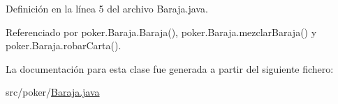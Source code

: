 Definición en la línea 5 del archivo Baraja.\+java.



Referenciado por poker.\+Baraja.\+Baraja(), poker.\+Baraja.\+mezclar\+Baraja() y poker.\+Baraja.\+robar\+Carta().



La documentación para esta clase fue generada a partir del siguiente fichero\+:\begin{DoxyCompactItemize}
\item 
src/poker/\mbox{\hyperlink{Baraja_8java}{Baraja.\+java}}\end{DoxyCompactItemize}
